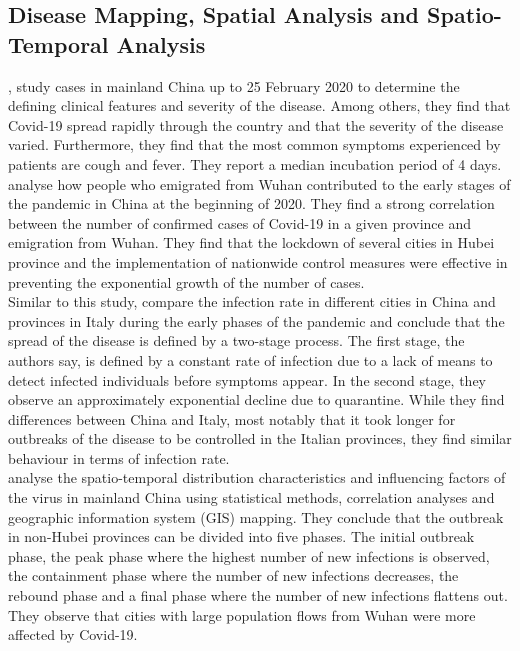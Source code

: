 \subsection{Disease Mapping, Spatial Analysis and Spatio-Temporal Analysis}
\cite{guan2020clinical}, study cases in mainland China up to 25 February 2020 to determine the defining clinical features and severity of the disease. Among others, they find that Covid-19 spread rapidly through the country and that the severity of the disease varied. Furthermore, they find that the most common symptoms experienced by patients are cough and fever. They report a median incubation period of 4 days.\\
\cite{chen2020distribution} analyse how people who emigrated from Wuhan contributed to the early stages of the pandemic in China at the beginning of 2020. They find a strong correlation between the number of confirmed cases of Covid-19 in a given province and emigration from Wuhan. They find that the lockdown of several cities in Hubei province and the implementation of nationwide control measures were effective in preventing the exponential growth of the number of cases. \\
Similar to this study, \cite{gross2020spatio} compare the infection rate in different cities in China and provinces in Italy during the early phases of the pandemic and conclude that the spread of the disease is defined by a two-stage process. The first stage, the authors say, is defined by a constant rate of infection due to a lack of means to detect infected individuals before symptoms appear. In the second stage, they observe an approximately exponential decline due to quarantine. While they find differences between China and Italy, most notably that it took longer for outbreaks of the disease to be controlled in the Italian provinces, they find similar behaviour in terms of infection rate. \\
\cite{chen2021spatio} analyse the spatio-temporal distribution characteristics and influencing factors of the virus in mainland China using statistical methods, correlation analyses and geographic information system (GIS) mapping. They conclude that the outbreak in non-Hubei provinces can be divided into five phases. The initial outbreak phase, the peak phase where the highest number of new infections is observed, the containment phase where the number of new infections decreases, the rebound phase and a final phase where the number of new infections flattens out. They observe that cities with large population flows from Wuhan were more affected by Covid-19. \\
